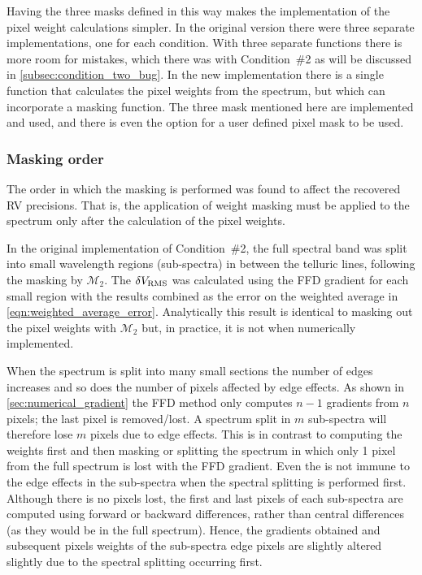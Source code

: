 Having the three masks defined in this way makes the implementation of the pixel weight calculations simpler.
In the original version there were three separate implementations, one for each condition.
With three separate functions there is more room for mistakes, which there was with Condition~\#2 as will be discussed in \cref{subsec:condition_two_bug}.
In the new implementation there is a single function that calculates the pixel weights from the spectrum, but which can incorporate a masking function.
The three mask mentioned here are implemented and used, and there is even the option for a user defined pixel mask to be used.


\subsubsection{Masking order}
\label{subsubsec:masking_order}
The order in which the masking is performed was found to affect the recovered {RV} precisions.
That is, the application of weight masking must be applied to the spectrum only after the calculation of the pixel weights.

In the original implementation of Condition~\#2, the full spectral band was split into small wavelength regions (sub-spectra) in between the telluric lines, following the masking by \(\mathcal{M}_{2}\).
The \(\delta V_{\textrm{RMS}}\) was calculated using the {FFD} gradient for each small region with the results combined as the error on the weighted average in \cref{eqn:weighted_average_error}.
Analytically this result is identical to masking out the pixel weights with \({\mathcal{M}}_{2}\) but, in practice, it is not when numerically implemented.

When the spectrum is split into many small sections the number of edges increases and so does the number of pixels affected by edge effects.
As shown in \cref{sec:numerical_gradient} the {FFD} method only computes \(n-1\) gradients from \(n\) pixels; the last pixel is removed/lost.
A spectrum split in \(m\) sub-spectra will therefore lose \(m\) pixels due to edge effects.
This is in contrast to computing the weights first and then masking or splitting the spectrum in which only 1 pixel from the full spectrum is lost with the {FFD} gradient.
Even the \npgradient{} is not immune to the edge effects in the sub-spectra when the spectral splitting is performed first.
Although there is no pixels lost, the first and last pixels of each sub-spectra are computed using forward or backward differences, rather than central differences (as they would be in the full spectrum).
Hence, the gradients obtained and subsequent pixels weights of the sub-spectra edge pixels are slightly altered slightly due to the spectral splitting occurring first.

